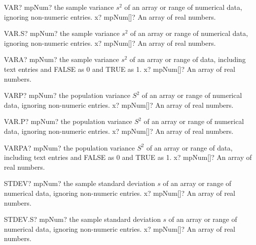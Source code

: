 \documentclass[12pt,a4paper,openany]{book}
\begin{document}
\begin{mpFunctionsExtract}
\mpWorksheetFunctionOneNotImplemented
{VAR? mpNum? the sample variance $s^2$ of an array or range of numerical data, ignoring non-numeric entries.}
{x? mpNum[]? An array of real numbers.}
\end{mpFunctionsExtract}

\begin{mpFunctionsExtract}
\mpWorksheetFunctionOneNotImplemented
{VAR.S? mpNum? the sample variance $s^2$ of an array or range of numerical data, ignoring non-numeric entries.}
{x? mpNum[]? An array of real numbers.}
\end{mpFunctionsExtract}

\begin{mpFunctionsExtract}
\mpWorksheetFunctionOneNotImplemented
{VARA? mpNum? the sample variance $s^2$ of an array or range of data, including text entries and FALSE as 0 and TRUE as 1.}
{x? mpNum[]? An array of real numbers.}
\end{mpFunctionsExtract}

\begin{mpFunctionsExtract}
\mpWorksheetFunctionOneNotImplemented
{VARP? mpNum? the population variance $S^2$ of an array or range of numerical data, ignoring non-numeric entries.}
{x? mpNum[]? An array of real numbers.}
\end{mpFunctionsExtract}

\begin{mpFunctionsExtract}
\mpWorksheetFunctionOneNotImplemented
{VAR.P? mpNum? the population variance $S^2$ of an array or range of numerical data, ignoring non-numeric entries.}
{x? mpNum[]? An array of real numbers.}
\end{mpFunctionsExtract}

\begin{mpFunctionsExtract}
\mpWorksheetFunctionOneNotImplemented
{VARPA? mpNum? the population variance $S^2$ of an array or range of data, including text entries and FALSE as 0 and TRUE as 1.}
{x? mpNum[]? An array of real numbers.}
\end{mpFunctionsExtract}

\begin{mpFunctionsExtract}
\mpWorksheetFunctionOneNotImplemented
{STDEV? mpNum? the sample standard deviation $s$ of an array or range of numerical data, ignoring non-numeric entries.}
{x? mpNum[]? An array of real numbers.}
\end{mpFunctionsExtract}

\begin{mpFunctionsExtract}
\mpWorksheetFunctionOneNotImplemented
{STDEV.S? mpNum? the sample standard deviation $s$ of an array or range of numerical data, ignoring non-numeric entries.}
{x? mpNum[]? An array of real numbers.}
\end{mpFunctionsExtract}
\end{document}
